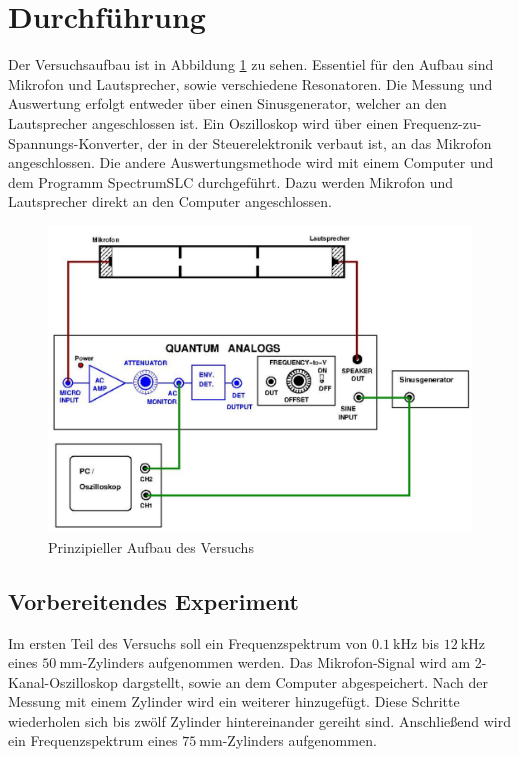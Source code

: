 \section{Durchführung}
\label{sec:Durchführung}
Der Versuchsaufbau ist in Abbildung \ref{fig:aufbau} zu sehen. Essentiel für den Aufbau sind Mikrofon und Lautsprecher, sowie verschiedene Resonatoren.
Die Messung und Auswertung erfolgt entweder über einen Sinusgenerator, welcher an den Lautsprecher angeschlossen ist.
Ein Oszilloskop wird über einen Frequenz-zu-Spannungs-Konverter, der in der Steuerelektronik verbaut ist, an das Mikrofon angeschlossen.
Die andere Auswertungsmethode wird mit einem Computer und dem Programm SpectrumSLC durchgeführt. Dazu werden Mikrofon und Lautsprecher direkt an den Computer angeschlossen.
\begin{figure}
    \centering
    \includegraphics[width=\textwidth]{pictures/Aufbau.png}
    \caption{Prinzipieller Aufbau des Versuchs \cite{}}
    \label{fig:aufbau}
\end{figure}
\subsection{Vorbereitendes Experiment}
Im ersten Teil des Versuchs soll ein Frequenzspektrum von $\SI{0.1}{\kilo\hertz}$ bis $\SI{12}{\kilo\hertz}$ eines $\SI{50}{\milli\meter}$-Zylinders aufgenommen werden.
Das Mikrofon-Signal wird am 2-Kanal-Oszilloskop dargstellt, sowie an dem Computer abgespeichert.
Nach der Messung mit einem Zylinder wird ein weiterer hinzugefügt. Diese Schritte wiederholen sich bis zwölf Zylinder hintereinander gereiht sind.
Anschließend wird ein Frequenzspektrum eines $\SI{75}{\milli\meter}$-Zylinders aufgenommen.

